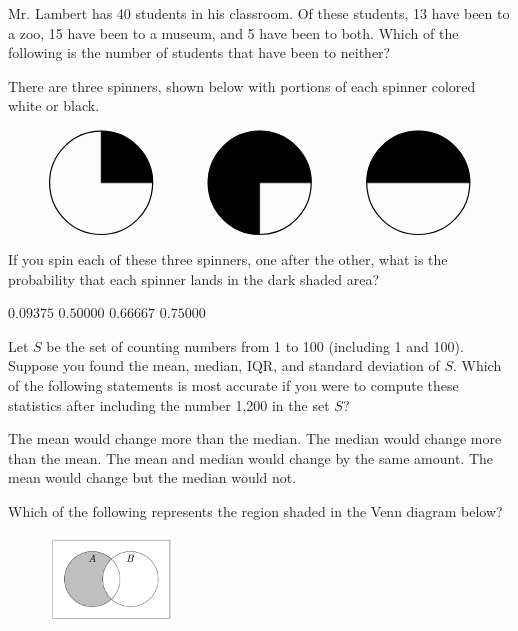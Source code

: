 \documentclass[12pt,letterpaper,answers]{exam}
\begin{document}
\begin{questions}
\vfill

\question Mr. Lambert has 40 students in his classroom. Of these students, 13 have been to a zoo, 15 have been to a museum, and 5 have been to both. Which of the following is the number of students that have been to neither?
	\begin{choices}
	\end{choices} 

\vfill

\question There are three spinners, shown below with portions of each spinner colored white or black.\par
	\[
	\begin{tikzpicture}
	\draw[line width=0.03cm] (0,0) circle (1.3);
	\draw[fill=black] (0,0) -- (1.3,0) arc[start angle=0, end angle=90,radius=1.3] -- (0,0);
	
	\draw[line width=0.03cm] (4,0) circle (1.3);
	\draw[fill=black] (4,0) -- (5.3,0) arc[start angle=0, end angle=270,radius=1.3] -- (4,0);

	\draw[line width=0.03cm] (8,0) circle (1.3);
	\draw[fill=black] (8,0) -- (9.3,0) arc[start angle=0, end angle=180,radius=1.3] -- (8,0);
	\end{tikzpicture} 
	\]
If you spin each of these three spinners, one after the other, what is the probability that each spinner lands in the dark shaded area?
	\begin{choices}
	\CorrectChoice $\mathbf{0.09375}$
	\choice $0.50000$
	\choice $0.66667$
	\choice $0.75000$
	\end{choices}

\vfill

\question Let $S$ be the set of counting numbers from 1 to 100 (including 1 and 100). Suppose you found the mean, median, IQR, and standard deviation of $S$. Which of the following statements is most accurate if you were to compute these statistics after including the number 1,200 in the set $S$?
	\begin{choices}
	\CorrectChoice The mean would change more than the median.
	\choice The median would change more than the mean.
	\choice The mean and median would change by the same amount.
	\choice The mean would change but the median would not.
	\end{choices}

\vfill

\question Which of the following represents the region shaded in the Venn diagram below?
	\begin{figure}[H]
	\centering
	\includegraphics[width=0.30\textwidth]{venn.png}
	\end{figure}
		

\end{questions}
\end{document}

